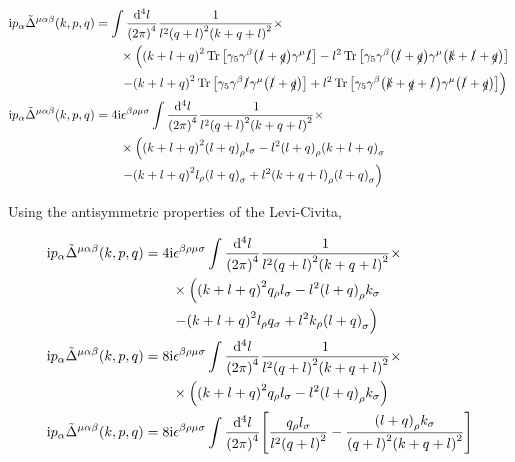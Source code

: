 \begin{align}
    \textnormal{i} p_\alpha{\tilde\Delta}^{\mu\alpha\beta}\qty(k,p,q)&=
    \int\frac{\dd[4]{l}}{\qty(2\pi)^4}\frac{1}{l^2\qty(q+l)^2\qty(k+q+l)^2}\times\nonumber\\
    &\quad\quad\times\left(
    \qty(k+l+q)^2\Tr\qty[\gamma_5\gamma^\beta \qty(\slashed {l}+\slashed q)\gamma^\mu\slashed l]
    -l^2\Tr\qty[\gamma_5\gamma^\beta \qty(\slashed {l}+\slashed q)\gamma^\mu\qty(\slashed k+\slashed l+\slashed q)]\right.\nonumber\\
    &\quad\quad\left.-\qty(k+l+q)^2\Tr\qty[\gamma_5\gamma^\beta\slashed l\gamma^\mu\qty(\slashed {l}+\slashed q)]
    +l^2\Tr\qty[\gamma_5\gamma^\beta\qty(\slashed {k}+\slashed{q}+\slashed l)\gamma^\mu\qty(\slashed {l}+\slashed q)]\right)\nonumber\\
    \textnormal{i} p_\alpha{\tilde\Delta}^{\mu\alpha\beta}\qty(k,p,q)&=4\textnormal{i}\epsilon^{\beta\rho\mu\sigma}
    \int\frac{\dd[4]{l}}{\qty(2\pi)^4}\frac{1}{l^2\qty(q+l)^2\qty(k+q+l)^2}\times\nonumber\\
    &\quad\quad\times\left(
    \qty(k+l+q)^2\qty(l+q)_\rho l_\sigma
    -l^2\qty( {l}+ q)_\rho\qty( k+ l+ q)_\sigma\right.\nonumber\\
    &\quad\quad\left.-\qty(k+l+q)^2l_\rho\qty( {l}+ q)_\sigma
    +l^2\qty( {k}+{q}+ l)_\rho\qty( {l}+ q)_\sigma\right)\nonumber
\end{align}

Using the antisymmetric properties of the Levi-Civita,

\begin{align}
    \textnormal{i} p_\alpha{\tilde\Delta}^{\mu\alpha\beta}\qty(k,p,q)&=4\textnormal{i}\epsilon^{\beta\rho\mu\sigma}
    \int\frac{\dd[4]{l}}{\qty(2\pi)^4}\frac{1}{l^2\qty(q+l)^2\qty(k+q+l)^2}\times\nonumber\\
    &\quad\quad\times\left(
    \qty(k+l+q)^2q_\rho l_\sigma
    -l^2\qty( {l}+ q)_\rho k_\sigma\right.\nonumber\\
    &\quad\quad\left.-\qty(k+l+q)^2l_\rho q_\sigma
    +l^2 k_\rho\qty( {l}+ q)_\sigma\right)\nonumber\\
    \textnormal{i} p_\alpha{\tilde\Delta}^{\mu\alpha\beta}\qty(k,p,q)&=8\textnormal{i}\epsilon^{\beta\rho\mu\sigma}
    \int\frac{\dd[4]{l}}{\qty(2\pi)^4}\frac{1}{l^2\qty(q+l)^2\qty(k+q+l)^2}\times\nonumber\\
    &\quad\quad\times\left(
    \qty(k+l+q)^2q_\rho l_\sigma
    -l^2\qty( {l}+ q)_\rho k_\sigma\right)\nonumber\\
    \textnormal{i} p_\alpha{\tilde\Delta}^{\mu\alpha\beta}\qty(k,p,q)&=8\textnormal{i}\epsilon^{\beta\rho\mu\sigma}
    \int\frac{\dd[4]{l}}{\qty(2\pi)^4}\qty[\frac{q_\rho l_\sigma}{l^2\qty(q+l)^2}-\frac{\qty( {l}+ q)_\rho k_\sigma}{\qty(q+l)^2\qty(k+q+l)^2}]\nonumber
\end{align}

